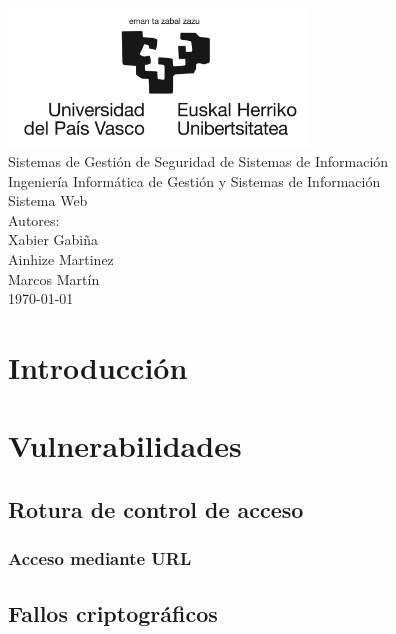\documentclass{report}
\begin{document}
    \begin{titlepage}
        \centering
        \includegraphics[width=0.6\textwidth]{./img/miscelanio/logo.jpg}\\
        \vspace{1cm}
        \LARGE Sistemas de Gestión de Seguridad de Sistemas de Información\\
        \vspace{0.5cm}
        \Large Ingeniería Informática de Gestión y Sistemas de Información\\
        \vspace{3cm}
        \Huge Sistema Web\\
        \vspace{2.5cm}
        \Large Autores:\\
        \vspace{0.2cm}
        \large Xabier Gabiña\\
        \large Ainhize Martinez\\
        \large Marcos Martín\\
        \vfill
        \today
    \end{titlepage}
    \tableofcontents
    \chapter{Introducción}
    \chapter{Vulnerabilidades}
        \section{Rotura de control de acceso}
            \subsection{Acceso mediante URL}

            \clearpage
        \section{Fallos criptográficos}
\end{document}
